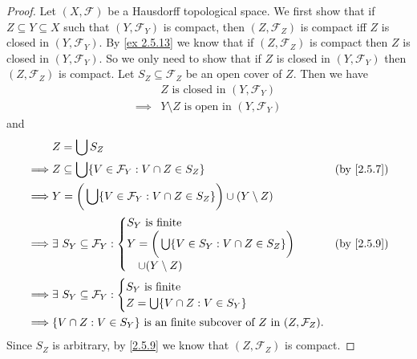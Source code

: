 \begin{proof}
  Let \((X, \mathcal{F})\) be a Hausdorff topological space.
  We first show that if \(Z \subseteq Y \subseteq X\) such that \((Y, \mathcal{F}_Y)\) is compact, then \((Z, \mathcal{F}_Z)\) is compact iff \(Z\) is closed in \((Y, \mathcal{F}_Y)\).
  By \cref{ex 2.5.13} we know that if \((Z, \mathcal{F}_Z)\) is compact then \(Z\) is closed in \((Y, \mathcal{F}_Y)\).
  So we only need to show that if \(Z\) is closed in \((Y, \mathcal{F}_Y)\) then \((Z, \mathcal{F}_Z)\) is compact.
  Let \(S_Z \subseteq \mathcal{F}_Z\) be an open cover of \(Z\).
  Then we have
  \begin{align*}
             & Z \text{ is closed in } (Y, \mathcal{F}_Y)           \\
    \implies & Y \setminus Z \text{ is open in } (Y, \mathcal{F}_Y)
  \end{align*}
  and
  \begin{align*}
             & Z = \bigcup S_Z                                                                                                         \\
    \implies & Z \subseteq \bigcup \{V \in \mathcal{F}_Y : V \cap Z \in S_Z\}                               & \text{(by \cref{2.5.7})} \\
    \implies & Y = \bigg(\bigcup \{V \in \mathcal{F}_Y : V \cap Z \in S_Z\}\bigg) \cup (Y \setminus Z)                                 \\
    \implies & \exists\ S_Y \subseteq \mathcal{F}_Y : \begin{cases}
                                                        S_Y \text{ is finite}                                    \\
                                                        Y = \bigg(\bigcup \{V \in S_Y : V \cap Z \in S_Z\}\bigg) \\
                                                        \quad \cup (Y \setminus Z)
                                                      \end{cases}                                  & \text{(by \cref{2.5.9})}          \\
    \implies & \exists\ S_Y \subseteq \mathcal{F}_Y : \begin{cases}
                                                        S_Y \text{ is finite} \\
                                                        Z = \bigcup \{V \cap Z : V \in S_Y\}
                                                      \end{cases}                                              \\
    \implies & \{V \cap Z : V \in S_Y\} \text{ is an finite subcover of } Z \text{ in } (Z, \mathcal{F}_Z).
  \end{align*}
  Since \(S_Z\) is arbitrary, by \cref{2.5.9} we know that \((Z, \mathcal{F}_Z)\) is compact.


\end{proof}
